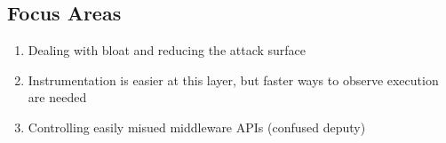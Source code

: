 \documentclass[11pt,letterpaper]{article}
\begin{document}
\subsection{Focus Areas}

\begin{enumerate}
	\item Dealing with bloat and reducing the attack surface
	\item Instrumentation is easier at this layer, but faster ways to observe execution are needed
	\item Controlling easily misued middleware APIs (confused deputy)
\end{enumerate}





  



\end{document}
